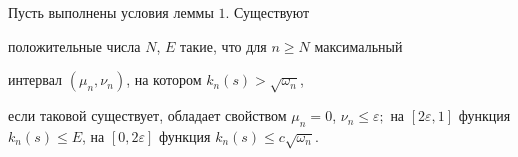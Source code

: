 \begin{lem}


Пусть выполнены условия леммы $1$. Существуют


положительные числа $N$, $E$ такие, что для $n \ge N$ максимальный


интервал $(\mu_n , \nu_n)$, на котором $k_n(s) > \sqrt{\omega_n}$,


если таковой существует, обладает свойством $\mu_n=0$, $\nu_n \le


\varepsilon;$ на $[2 \varepsilon ,1]$ функция $k_n(s) \le E$, на $[0,


2\varepsilon]$ функция $k_n(s) \le c \sqrt{\omega_n}$.


\end{lem}





